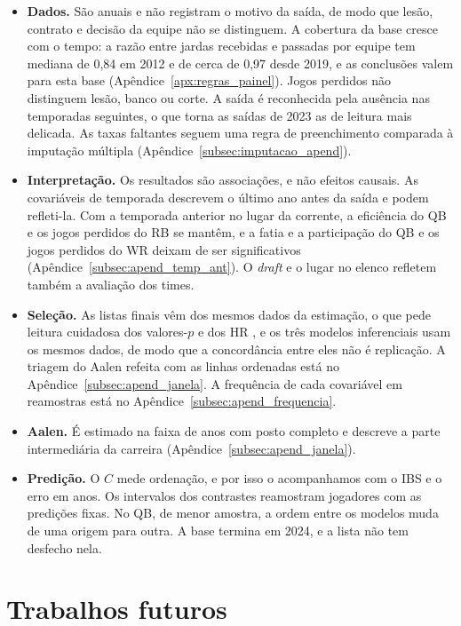 \begin{itemize}
  \item \textbf{Dados.} São anuais e não registram o motivo da saída, de modo que lesão, contrato e decisão da equipe não se distinguem. A cobertura da base cresce com o tempo: a razão entre jardas recebidas e passadas por equipe tem mediana de 0,84 em 2012 e de cerca de 0,97 desde 2019, e as conclusões valem para esta base (Apêndice~\ref{apx:regras_painel}). Jogos perdidos não distinguem lesão, banco ou corte. A saída é reconhecida pela ausência nas temporadas seguintes, o que torna as saídas de 2023 as de leitura mais delicada. As taxas faltantes seguem uma regra de preenchimento comparada à imputação múltipla (Apêndice~\ref{subsec:imputacao_apend}).
  \item \textbf{Interpretação.} Os resultados são associações, e não efeitos causais. As covariáveis de temporada descrevem o último ano antes da saída e podem refleti-la. Com a temporada anterior no lugar da corrente, a eficiência do QB e os jogos perdidos do RB se mantêm, e a fatia e a participação do QB e os jogos perdidos do WR deixam de ser significativos (Apêndice~\ref{subsec:apend_temp_ant}). O \textit{draft} e o lugar no elenco refletem também a avaliação dos times.
  \item \textbf{Seleção.} As listas finais vêm dos mesmos dados da estimação, o que pede leitura cuidadosa dos valores-$p$ e dos HR \citep{harrell2001}, e os três modelos inferenciais usam os mesmos dados, de modo que a concordância entre eles não é replicação. A triagem do Aalen refeita com as linhas ordenadas está no Apêndice~\ref{subsec:apend_janela}. A frequência de cada covariável em reamostras está no Apêndice~\ref{subsec:apend_frequencia}.
  \item \textbf{Aalen.} É estimado na faixa de anos com posto completo e descreve a parte intermediária da carreira (Apêndice~\ref{subsec:apend_janela}).
  \item \textbf{Predição.} O $C$ mede ordenação, e por isso o acompanhamos com o IBS e o erro em anos. Os intervalos dos contrastes reamostram jogadores com as predições fixas. No QB, de menor amostra, a ordem entre os modelos muda de uma origem para outra. A base termina em 2024, e a lista não tem desfecho nela.
\end{itemize}

\section{Trabalhos futuros}
\label{sec:futuros}

